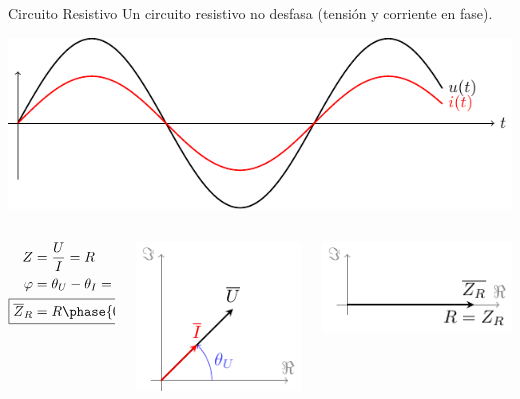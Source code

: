 \documentclass[aspectratio=169, usenames,svgnames,dvipsnames]{beamer}
\begin{document}
\begin{frame}[label={sec:org5b8cdc6}]{Circuito Resistivo}
Un circuito resistivo no desfasa (\alert{tensión y corriente en fase}).
\begin{center}
\includegraphics[height=0.3\textheight]{../figs/resistivo.pdf}
\end{center}

\begin{columns}
\begin{column}{0.3\columnwidth}
\begin{align*}
  Z &= \frac{U}{I} = R\\
  \varphi &= \theta_U - \theta_I = 0\\
  \Aboxed{\overline{Z}_R &= R \phase{0}}
\end{align*}
\end{column}

\begin{column}{0.35\columnwidth}
\begin{center}
\includegraphics[height=0.35\textheight]{../figs/fasorResistencia_VI.pdf}
\end{center}
\end{column}


\begin{column}{0.35\columnwidth}
\begin{center}
\includegraphics[height=0.25\textheight]{../figs/fasorResistencia.pdf}
\end{center}
\end{column}
\end{columns}
\end{frame}
\end{document}
